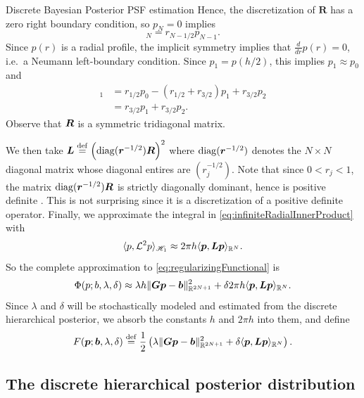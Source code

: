 \begin{chapter}{Discrete Bayesian Posterior PSF estimation}
Hence, the discretization of $\bm R$ has a zero right boundary condition, so $p_{N}= 0$ implies
\begin{equation}
  [\vect R\vect p]_N = r_{N-1/2}p_{N-1}.
\end{equation}
Since $p(r)$ is a radial profile, the implicit symmetry implies that $\frac d{dr}p(r) = 0$, i.e.~a Neumann left-boundary condition. 
Since $p_1 = p( h/2 )$, this implies $p_1 \approx p_{0}$ and
\begin{align}
  [\vect R\vect p]_1 &= r_{1/2}p_0 - (r_{1/2}+r_{3/2})p_1 + r_{3/2}p_{2} \nonumber\\
  &= r_{3/2}p_1 + r_{3/2}p_{2}.
\end{align}
Observe that $\mbox{\boldmath$R$}$ is a symmetric tridiagonal matrix.

We then take $\mbox{\boldmath$L$} \stackrel{\rm def}{=} \Big(\mathrm{diag}(\mbox{\boldmath$r$}^{-1/2}) \mbox{\boldmath$R$}\Big)^2$ where $\mathrm{diag}(\mbox{\boldmath$r$}^{-1/2})$ denotes the $N\times N$ diagonal matrix whose diagonal entires are $(r_j^{-1/2})$.
Note that since $0<r_j<1$, the matrix $\mathrm{diag}(\mbox{\boldmath$r$}^{-1/2}) \mbox{\boldmath$R$}$ is strictly diagonally dominant, hence is positive definite \citep[Theorem 3.4.3]{golub2012matrix}.
This is not surprising since it is a discretization of a positive definite operator.
Finally, we approximate the integral in \eqref{eq:infiniteRadialInnerProduct} with 
\begin{equation}\label{eq:psfDiscInvProblem}
  \langle p, \mathcal L^2 p\rangle_{\mathscr H_1} \approx 2\pi h \langle \mbox{\boldmath$p$}, \mbox{\boldmath$L$} \mbox{\boldmath$p$}\rangle_{\mathbb R^N}.
\end{equation}
So the complete approximation to \eqref{eq:regularizingFunctional} is
\begin{equation} \label{eq:discreteRegularizingFunctional}
  \Phi(p; b,\lambda,\delta) \approx \lambda h \|\mbox{\boldmath$G$}\mbox{\boldmath$p$} - \mbox{\boldmath$b$}\|_{\mathbb R^{2N+1}}^2 + \delta 2\pi h\langle \mbox{\boldmath$p$}, \mbox{\boldmath$L$} \mbox{\boldmath$p$}\rangle_{\mathbb R^N}.
\end{equation}
Since $\lambda$ and $\delta$ will be stochastically modeled and estimated from the discrete hierarchical posterior, we absorb the constants $h$ and $2\pi h$ into them, and define
\begin{equation} \label{discreteRegularizingFunctional}
  F(\mbox{\boldmath$p$}; \mbox{\boldmath$b$},\lambda,\delta) \stackrel{\rm def}{=} \frac 12\left(\lambda \|\mbox{\boldmath$G$}\mbox{\boldmath$p$} - \mbox{\boldmath$b$}\|_{\mathbb R^{2N+1}}^2 + \delta \langle \mbox{\boldmath$p$}, \mbox{\boldmath$L$} \mbox{\boldmath$p$}\rangle_{\mathbb R^N}\right).
\end{equation}
\subsection{The discrete hierarchical posterior distribution}


\end{chapter}
